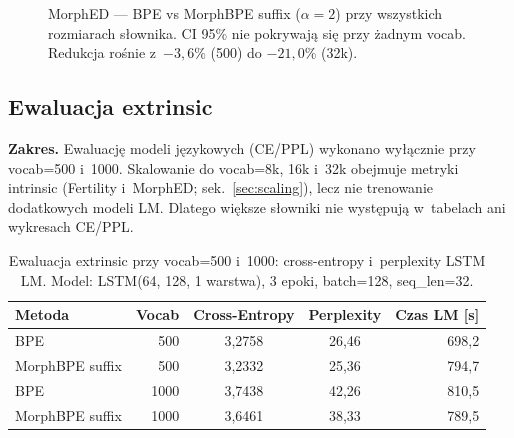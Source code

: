 \begin{figure}[h]
  \centering
  \caption{MorphED --- BPE vs MorphBPE suffix ($\alpha{=}2$) przy wszystkich
  rozmiarach słownika. CI 95\% nie pokrywają się przy żadnym vocab.
  Redukcja rośnie z~$-3{,}6\%$ (500) do $-21{,}0\%$ (32k).}
  \label{fig:morphed}
\end{figure}

\subsection*{Ewaluacja extrinsic}

\textbf{Zakres.} Ewaluację modeli językowych (CE/PPL) wykonano wyłącznie
przy vocab=500 i~1000. Skalowanie do vocab=8k, 16k i~32k obejmuje
metryki intrinsic (Fertility i~MorphED; sek.~\ref{sec:scaling}), lecz nie
trenowanie dodatkowych modeli LM. Dlatego większe słowniki nie występują
w~tabelach ani wykresach CE/PPL.

\begin{table}[h]
  \centering
  \caption{Ewaluacja extrinsic przy vocab=500 i~1000: cross-entropy i~perplexity LSTM LM.
  Model: LSTM(64, 128, 1 warstwa), 3 epoki, batch=128, seq\_len=32.}
  \label{tab:extrinsic}
  \begin{tabular}{lrccr}
    \toprule
    Metoda & Vocab & Cross-Entropy & Perplexity & Czas LM [s] \\
    \midrule
    BPE                  & 500  & 3{,}2758 & 26{,}46 & 698{,}2 \\
    MorphBPE suffix      & 500  & 3{,}2332 & 25{,}36 & 794{,}7 \\
    \addlinespace
    BPE                  & 1000 & 3{,}7438 & 42{,}26 & 810{,}5 \\
    MorphBPE suffix      & 1000 & 3{,}6461 & 38{,}33 & 789{,}5 \\
    \bottomrule
  \end{tabular}
\end{table}


